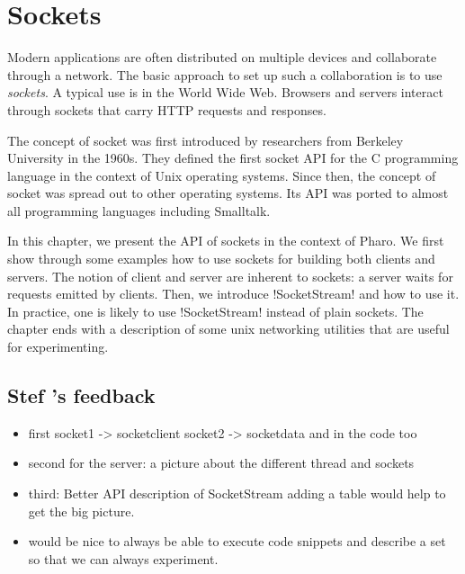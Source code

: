 \documentclass[a4paper,10pt,twoside]{book}
\begin{document}
	\sloppy
\fi
\newcommand{\nouryComment}[1]{}


\chapter{Sockets}\label{cha:sockets}
\chapterauthor{\authornoury{}}

Modern applications are often distributed on multiple devices and collaborate through a network.
The basic approach to set up such a collaboration is to use \textit{sockets}. A typical use is in the World Wide Web. Browsers and servers interact through sockets that carry HTTP requests and responses.

The concept of socket was first introduced by researchers from Berkeley University in the 1960s. They defined the first socket API for the C programming language in the context of Unix operating systems. Since then, the concept of socket was spread out to other operating systems. 
Its API was ported to almost all programming languages including Smalltalk.

In this chapter, we present the API of sockets in the context of Pharo.
We first show through some examples how to use sockets for building both clients and servers. The notion of client and server are inherent to sockets: a server waits for requests emitted by clients.
Then, we introduce \ct!SocketStream! and how to use it.
In practice, one is likely to use \ct!SocketStream! instead of plain sockets.
The chapter ends with a description of some unix networking utilities that are useful for experimenting.

\section*{Stef 's feedback}

\begin{itemize}
\item first 		socket1 -> socketclient
		socket2 -> socketdata
		and in the code too

\item second 
	for the server: a picture about the different thread and sockets

\item third: Better API description of SocketStream
	adding a table would help to get the big picture.
	
\item would be nice to always be able to execute code snippets and describe a set so that we can always experiment.
\end{itemize}
\end{document}
